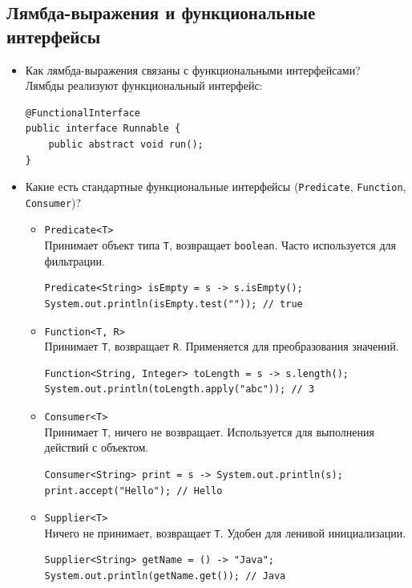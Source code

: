 \documentclass[a4paper,14pt]{article}
\begin{document}
\subsection{Лямбда-выражения и функциональные интерфейсы}

\begin{itemize}
    \item Как лямбда-выражения связаны с функциональными интерфейсами? \\
    Лямбды реализуют функциональный интерфейс:
\begin{lstlisting}[style=javastyle]
@FunctionalInterface
public interface Runnable {
    public abstract void run();
}
\end{lstlisting}
    \item Какие есть стандартные функциональные интерфейсы (\texttt{Predicate}, \texttt{Function}, \texttt{Consumer})? \\
    \begin{itemize}
    \item \texttt{Predicate<T>} \\
    Принимает объект типа \texttt{T}, возвращает \texttt{boolean}. Часто используется для фильтрации.
    \begin{lstlisting}[style=javastyle]
Predicate<String> isEmpty = s -> s.isEmpty();
System.out.println(isEmpty.test("")); // true
    \end{lstlisting}
    
    \item \texttt{Function<T, R>} \\
    Принимает \texttt{T}, возвращает \texttt{R}. Применяется для преобразования значений.
    \begin{lstlisting}[style=javastyle]
Function<String, Integer> toLength = s -> s.length();
System.out.println(toLength.apply("abc")); // 3
    \end{lstlisting}
    
    \item \texttt{Consumer<T>} \\
    Принимает \texttt{T}, ничего не возвращает. Используется для выполнения действий с объектом.
    \begin{lstlisting}[style=javastyle]
Consumer<String> print = s -> System.out.println(s);
print.accept("Hello"); // Hello
    \end{lstlisting}
    
    \item \texttt{Supplier<T>} \\
    Ничего не принимает, возвращает \texttt{T}. Удобен для ленивой инициализации.
    \begin{lstlisting}[style=javastyle]
Supplier<String> getName = () -> "Java";
System.out.println(getName.get()); // Java
    \end{lstlisting}
    

\end{itemize}
\end{itemize}
\end{document}
